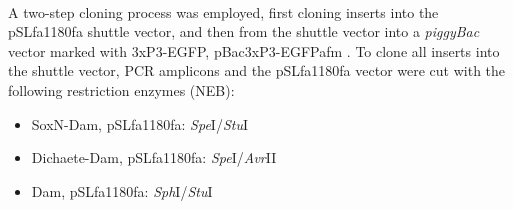 \paragraph{}
A two-step cloning process was employed, first cloning inserts into the pSLfa1180fa shuttle vector, and then from the shuttle vector into a \emph{piggyBac} vector marked with 3xP3-EGFP, pBac{3xP3-EGFPafm} \citep{horn_versatile_2000}. To clone all inserts into the shuttle vector, PCR amplicons and the pSLfa1180fa vector were cut with the following restriction enzymes (NEB):
\begin{itemize}
	\item SoxN-Dam, pSLfa1180fa: \emph{Spe}I/\emph{Stu}I
	\item Dichaete-Dam, pSLfa1180fa: \emph{Spe}I/\emph{Avr}II
	\item Dam, pSLfa1180fa: \emph{Sph}I/\emph{Stu}I
\end{itemize}
    

